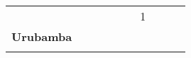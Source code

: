\begin{tabular}{lccccccccc}
	&\cellcolor[HTML]{FCC46C}                   &\cellcolor[HTML]{FCC46C} 	  &\cellcolor[HTML]{FCC46C} 					&\cellcolor[HTML]{FCC46C} 					
	&\cellcolor[HTML]{FCC46C}					&1
	&\cellcolor[HTML]{FCC46C}\\
	\textbf{Urubamba}                                                    
	&\cellcolor[HTML]{FCC46C}                   &\cellcolor[HTML]{FCC46C}                     &\cellcolor[HTML]{FCC46C}                   &\cellcolor[HTML]{FCC46C} 		 &\cellcolor[HTML]{FCC46C}					&\cellcolor[HTML]{FCC46C}      
	&\cellcolor[HTML]{FCC46C}					&\cellcolor[HTML]{FCC46C}		
	&\cellcolor[HTML]{FCC46C}\\
	&\multicolumn{1}{l}{}                       &\multicolumn{1}{l}{}            &\multicolumn{1}{l}{}                         
	&\multicolumn{1}{l}{}                       &\multicolumn{1}{l}{}            &\multicolumn{1}{l}{}                       &\multicolumn{1}{l}{}                       &\multicolumn{1}{l}{}            &\multicolumn{1}{l}{}    
\end{tabular}